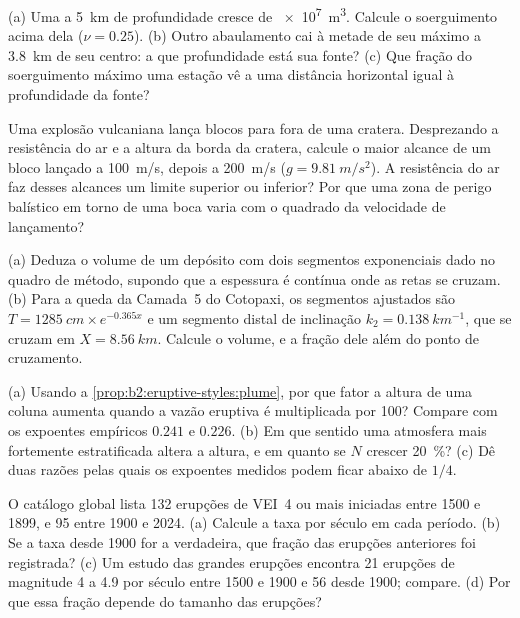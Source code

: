 \begin{exercise}[$\star\star$]\label{exo:b2:eruptive-styles:8}
(a) Uma  a \qty{5}{km} de profundidade cresce de \qty{e7}{m^3}. Calcule o
soerguimento acima dela ($\nu = 0.25$). (b) Outro abaulamento cai à metade de seu máximo
a \qty{3.8}{km} de seu centro: a que profundidade está sua fonte? (c) Que fração do
soerguimento máximo uma estação vê a uma distância horizontal igual à profundidade da
fonte?
\end{exercise}

\begin{exercise}[$\star\star$]\label{exo:b2:eruptive-styles:9}
Uma explosão vulcaniana lança blocos para fora de uma cratera. Desprezando a resistência do ar
e a altura da borda da cratera, calcule o maior alcance de um bloco lançado
a \qty{100}{m/s}, depois a \qty{200}{m/s} ($g = \qty{9.81}{m/s^2}$). A resistência do ar
faz desses alcances um limite superior ou inferior? Por que uma zona de
perigo balístico em torno de uma boca varia com o quadrado da velocidade de lançamento?
\end{exercise}

\begin{exercise}[$\star\star\star$]\label{exo:b2:eruptive-styles:10}
(a) Deduza o volume de um depósito com dois segmentos exponenciais dado no
quadro de método, supondo que a espessura é contínua onde as retas se cruzam. (b) Para
a queda da Camada~5 do Cotopaxi, os segmentos ajustados são $T = \qty{1285}{cm}\times
e^{-0.365x}$ e um segmento distal de inclinação $k_2 = \qty{0.138}{km^{-1}}$, que se cruzam em
$X = \qty{8.56}{km}$. Calcule o volume, e a fração dele além do ponto de
cruzamento.
\end{exercise}

\begin{exercise}[$\star\star\star$]\label{exo:b2:eruptive-styles:11}
(a) Usando a \cref{prop:b2:eruptive-styles:plume}, por que fator a altura de uma
coluna aumenta quando a vazão eruptiva é multiplicada por 100? Compare com os
expoentes empíricos $0.241$ e $0.226$. (b) Em que sentido uma atmosfera mais fortemente
estratificada altera a altura, e em quanto se $N$ crescer
\qty{20}{\percent}? (c) Dê duas razões pelas quais os expoentes medidos podem ficar abaixo de
$1/4$.
\end{exercise}

\begin{exercise}[$\star\star\star$]\label{exo:b2:eruptive-styles:12}
O catálogo global lista 132 erupções de VEI~4 ou mais iniciadas entre 1500
e 1899, e 95 entre 1900 e 2024. (a) Calcule a taxa por século em cada
período. (b) Se a taxa desde 1900 for a verdadeira, que fração das erupções anteriores
foi registrada? (c) Um estudo das grandes erupções encontra 21 erupções de
magnitude 4 a 4.9 por século entre 1500 e 1900 e 56 desde 1900; compare.
(d) Por que essa fração depende do tamanho das erupções?
\end{exercise}

